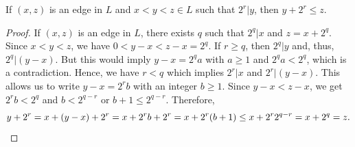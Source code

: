 \documentclass[a4paper,UKenglish,cleveref,nolineno,autoref]{socg-lipics-v2021}
\begin{document}
\begin{lemma} \label{prop:crossing}
If $(x,z)$ is an edge in $L$ and $x<y<z\in L$ such that $2^r\vert y$, then $y+2^r\leq z$.  
\end{lemma}

\begin{proof}
If $(x,z)$ is an edge in $L$, there exists $q$ such that $2^q\vert x$ and $z=x+2^q$. Since $x<y<z$, we have $0<y-x<z-x=2^q$. If $r\geq q$, then $2^q\vert y$ and, thus, $2^q\vert(y-x)$. But this would imply $y-x=2^qa$ with $a\geq 1$ and $2^qa<2^q$, which is a contradiction. Hence, we have $r<q$ which implies $2^r\vert x$ and $2^r\vert(y-x)$. This allows us to write $y-x=2^rb$ with an integer $b\geq 1$. Since $y-x<z-x$, we get $2^rb<2^q$ and $b<2^{q-r}$ or $b+1\leq 2^{q-r}$. Therefore,
\begin{equation*}
y+2^r=x+(y-x)+2^r=x+2^rb+2^r=x+2^r(b+1)\leq x+2^r2^{q-r}=x+2^q=z.\qedhere
\end{equation*}
\end{proof}
\end{document}
